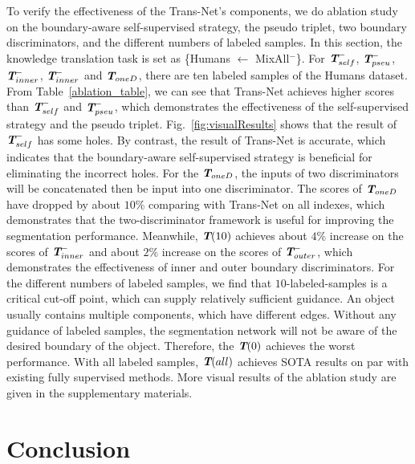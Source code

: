 \documentclass[letterpaper]{article} %
\begin{document}
To verify the effectiveness of the Trans-Net's components, we do ablation study on the boundary-aware self-supervised strategy, the pseudo triplet, two boundary discriminators, and the different numbers of labeled samples.
In this section, the knowledge translation task is set as \{Humans $\leftarrow$ MixAll$^{-}$\}.
For $\textbf{\em T}_{self}^{-}$, $\textbf{\em T}_{pseu}^{-}$, $\textbf{\em T}_{inner}^{-}$, $\textbf{\em T}_{inner}^{-}$ and $\textbf{\em T}_{oneD}$, there are ten labeled samples of the Humans dataset. From Table~\ref{ablation_table}, we can see that Trans-Net achieves higher scores than $\textbf{\em T}_{self}^{-}$ and $\textbf{\em T}_{pseu}^{-}$, which demonstrates the effectiveness of the self-supervised strategy and the pseudo triplet.
Fig.~\ref{fig:visualResults} shows that the result of $\textbf{\em T}_{self}^{-}$ has some holes. By contrast, the result of Trans-Net is accurate, which indicates that the boundary-aware self-supervised strategy is beneficial for eliminating the incorrect holes. For the $\textbf{\em T}_{oneD}$, the inputs of two discriminators will be concatenated then be input into one discriminator. The scores of $\textbf{\em T}_{oneD}$ have dropped by about $10\%$ comparing with Trans-Net on all indexes,  which demonstrates that the two-discriminator framework is useful for improving the segmentation performance.
Meanwhile, $\textbf{\em T}(10)$ achieves
about $4\%$ increase on the scores of $\textbf{\em T}_{inner}^{-}$ and about $2\%$ increase on the scores of $\textbf{\em T}_{outer}^{-}$,
which demonstrates the effectiveness of inner and outer boundary discriminators.
For the different numbers of labeled samples, we find that $10$-labeled-samples is a critical cut-off point, which can supply relatively sufficient guidance. An object usually contains multiple components, which have different edges. Without any guidance of labeled samples, the segmentation network will not be aware of
the desired boundary of the object. Therefore, the $\textbf{\em T}(0)$ achieves the worst performance.
With all labeled samples, $\textbf{\em T}(all)$ achieves SOTA results on par with existing fully supervised methods.
More visual results of the ablation study are given in the supplementary materials.




\section{Conclusion}
\end{document}

